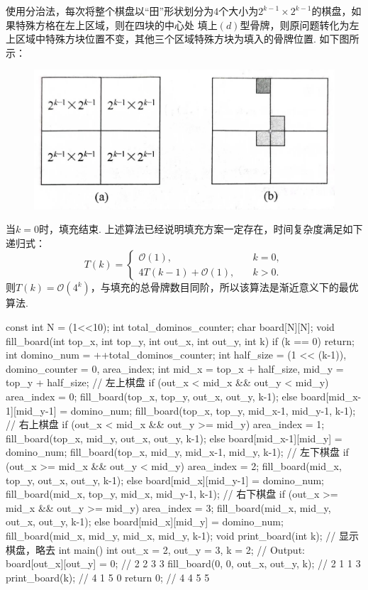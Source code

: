 \documentclass[12pt, a4paper, oneside]{ctexart}
\numberwithin{equation}{section}  %
\theoremstyle{definition}
\def\O{\mathcal{O}}         %
\begin{document}
使用分治法，每次将整个棋盘以“田”形状划分为$4$个大小为$2^{k-1}\times 2^{k-1}$的棋盘，如果特殊方格在左上区域，则在四块的中心处
填上$(d)$型骨牌，则原问题转化为左上区域中特殊方块位置不变，其他三个区域特殊方块为填入的骨牌位置. 如下图所示：
\begin{figure}[htbp]
    \centering
    \includegraphics[scale=0.15]{board_division.jpg}
\end{figure}
当$k=0$时，填充结束. 上述算法已经说明填充方案一定存在，时间复杂度满足如下递归式：
\begin{equation*}
    T(k) = \begin{cases}
        \O(1),&\quad k=0,\\
        4T(k-1)+\O(1),&\quad k > 0.
    \end{cases}
\end{equation*}
则$T(k) = \O(4^k)$，与填充的总骨牌数目同阶，所以该算法是渐近意义下的最优算法.

\begin{cppcode}
const int N = (1<<10);
int total_dominos_counter;
char board[N][N];
void fill_board(int top_x, int top_y, int out_x, int out_y, int k) {
    if (k == 0) return;
    int domino_num = ++total_dominos_counter;
    int half_size = (1 << (k-1)), domino_counter = 0, area_index;
    int mid_x = top_x + half_size, mid_y = top_y + half_size;
    // 左上棋盘
    if (out_x < mid_x && out_y < mid_y) {
        area_index = 0;
        fill_board(top_x, top_y, out_x, out_y, k-1);
    } else {
        board[mid_x-1][mid_y-1] = domino_num;
        fill_board(top_x, top_y, mid_x-1, mid_y-1, k-1);
    }
    // 右上棋盘
    if (out_x < mid_x && out_y >= mid_y) {
        area_index = 1;
        fill_board(top_x, mid_y, out_x, out_y, k-1);
    } else {
        board[mid_x-1][mid_y] = domino_num;
        fill_board(top_x, mid_y, mid_x-1, mid_y, k-1);
    }
    // 左下棋盘
    if (out_x >= mid_x && out_y < mid_y) {
        area_index = 2;
        fill_board(mid_x, top_y, out_x, out_y, k-1);
    } else {
        board[mid_x][mid_y-1] = domino_num;
        fill_board(mid_x, top_y, mid_x, mid_y-1, k-1);
    }
    // 右下棋盘
    if (out_x >= mid_x && out_y >= mid_y) {
        area_index = 3;
        fill_board(mid_x, mid_y, out_x, out_y, k-1);
    } else {
        board[mid_x][mid_y] = domino_num;
        fill_board(mid_x, mid_y, mid_x, mid_y, k-1);
    }
}
void print_board(int k);  // 显示棋盘，略去
int main() {                            
    int out_x = 2, out_y = 3, k = 2;    //  Output:
    board[out_x][out_y] = 0;            //  2  2  3  3
    fill_board(0, 0, out_x, out_y, k);  //  2  1  1  3
    print_board(k);                     //  4  1  5  0
    return 0;                           //  4  4  5  5
}
\end{cppcode}
\end{document}
